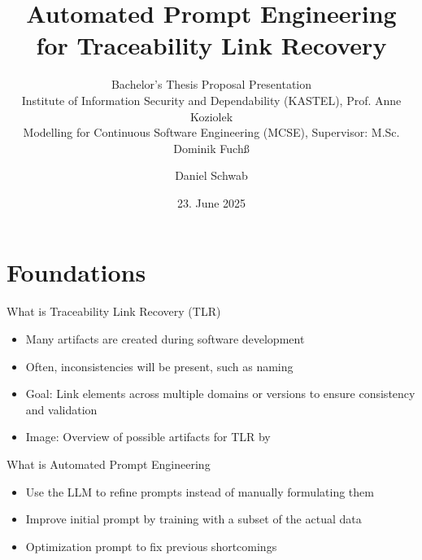 \documentclass{sdqbeamer}
\title[Automated Prompt Engineering for Traceability Link Recovery]{Automated Prompt Engineering for Traceability Link Recovery}
\subtitle{Bachelor's Thesis Proposal Presentation \\
Institute of Information Security and Dependability (KASTEL), Prof. Anne Koziolek \\
Modelling for Continuous Software Engineering (MCSE), Supervisor:  M.Sc. Dominik Fuchß}
\author{Daniel Schwab}
\date[23.\,06.\,2025]{23. June 2025}
\begin{document}
\begin{frame}[title white horizontal, picture=images/palladio_bauplan, kitlogo=white]
\titlepage
\end{frame}



\section{Foundations}


\begin{frame}[picture 66 vertical, picture=images/artifact_overview_Fuchß.png]{What is Traceability Link Recovery (TLR)}
	\begin{itemize}
		\item Many artifacts are created during software development
            \item Often, inconsistencies will be present, such as naming
            \item Goal: Link elements across multiple domains or versions to ensure consistency and validation
            \item Image: Overview of possible artifacts for TLR by \cite{fuchss2025LiSSAGeneric}
	\end{itemize}
\end{frame}


\begin{frame}[picture 66 vertical, picture=images/iterative_core_loop.pdf]{What is Automated Prompt Engineering}
    \begin{itemize}
        \item Use the LLM to refine prompts instead of manually formulating them
        \item Improve initial prompt by training with a subset of the actual data
        \item Optimization prompt to fix previous shortcomings
    \end{itemize} 
\end{frame}

\begin{comment}
\begin{frame}
\frametitle{The LiSSA Framework}
    \begin{figure}
        \centering
        \texttt{[image: images/LiSSA\_pipeline\_Fuchß.png]}
        \caption{LiSSA pipeline by \cite{fuchss2025LiSSAGeneric}}
        \label{fig:enter-label}
    \end{figure}
    \begin{itemize}
        \item This work will add to the prompting step of the LiSSA framework
    \end{itemize}
    
\end{frame}
\end{comment}
\end{document}

